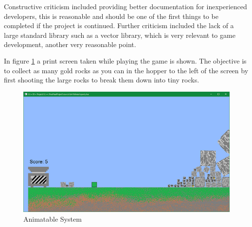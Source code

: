 \documentclass[11pt,a4paper,titlepage]{report}
\begin{document}
	Constructive criticism included providing better documentation for inexperienced developers, this is reasonable and should be one of the first things to be completed if the project is continued. Further criticism included the lack of a large standard library such as a vector library, which is very relevant to game development, another very reasonable point. 
	
	In figure \ref{fig:Game1} a print screen taken while playing the game is shown. The objective is to collect as many gold rocks as you can in the hopper to the left of the screen by first shooting the large rocks to break them down into tiny rocks.

	\begin{figure}[h] 
		\centering
		\includegraphics[scale=0.75]{game1}
		\caption{Animatable System}
		\label{fig:Game1}
	\end{figure}





	
\end{document}
